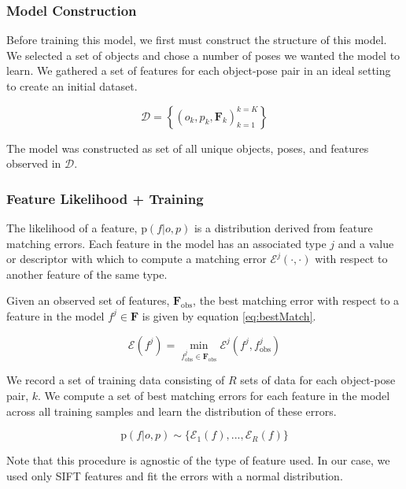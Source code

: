 \documentclass[conference]{IEEEtran}
\newcommand{\prob}[1]{\text{p}(#1)} %
\newcommand{\set}[1]{\mathbf{#1}} %
\newcommand{\cursive}[1]{\mathcal{#1}}
\begin{document}
    \subsubsection{Model Construction}
        Before training this model, we first must construct the structure of this model. We selected a set of objects and chose a number of poses we wanted the model to learn. We gathered a set of features for each object-pose pair in an ideal setting to create an initial dataset.

        \begin{equation}
            \cursive{D} = \left\{ \left(o_k,p_k,\set{F}_k\right)^{k=K}_{k=1} \right\}
        \end{equation}

        The model was constructed as set of all unique objects, poses, and features observed in $\cursive{D}$.

    \subsubsection{Feature Likelihood + Training}
        The likelihood of a feature, $\prob{f|o,p}$ is a distribution derived from feature matching errors. Each feature in the model has an associated type $j$ and a value or descriptor with which to compute a matching error $\cursive{E}^j(\cdot,\cdot)$ with respect to another feature of the same type. 

        Given an observed set of features, $\set{F}_{\text{obs}}$, the best matching error with respect to a feature in the model $f^j \in \set{F}$ is given by equation \ref{eq:bestMatch}.

        \begin{equation}
            \label{eq:bestMatch}
            \cursive{E}(f^j) = \min_{f^j_{\text{obs}} \in \set{F}_{\text{obs}}}\cursive{E}^j(f^j,f^j_{\text{obs}})
        \end{equation}

        We record a set of training data consisting of $R$ sets of data for each object-pose pair, $k$. We compute a set of best matching errors for each feature in the model across all training samples and learn the distribution of these errors.

        \begin{equation}
            \prob{f|o,p} \sim \{\cursive{E}_1(f), ...,  \cursive{E}_R(f)\}
        \end{equation}

        Note that this procedure is agnostic of the type of feature used. In our case, we used only SIFT features and fit the errors with a normal distribution. 
\end{document}
